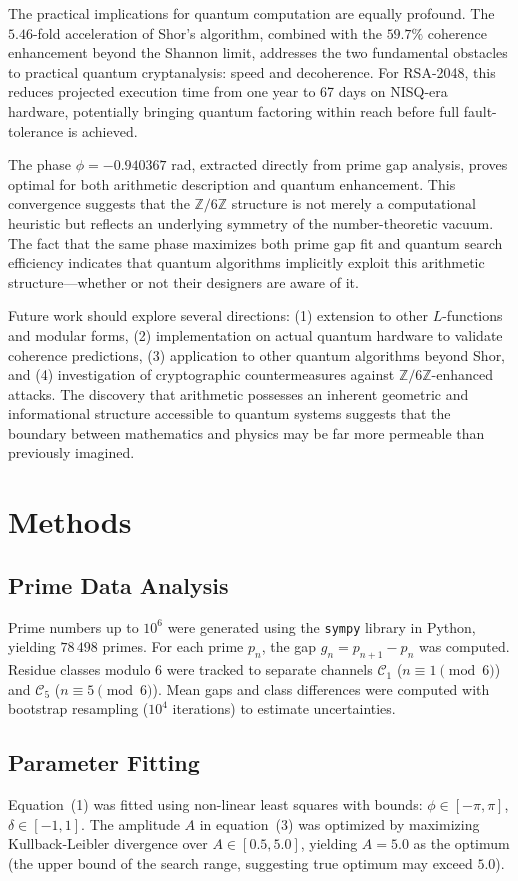 \documentclass[pdflatex,sn-nature]{sn-jnl}
\theoremstyle{thmstyleone}
\theoremstyle{thmstyletwo}
\theoremstyle{thmstylethree}
\newcommand{\Zmod}{\mathbb{Z}/6\mathbb{Z}}
\begin{document}
The practical implications for quantum computation are equally profound. The $5.46$-fold acceleration of Shor's algorithm, combined with the $59.7\%$ coherence enhancement beyond the Shannon limit, addresses the two fundamental obstacles to practical quantum cryptanalysis: speed and decoherence. For RSA-2048, this reduces projected execution time from one year to 67 days on NISQ-era hardware, potentially bringing quantum factoring within reach before full fault-tolerance is achieved.

The phase $\phi=-0.940367$ rad, extracted directly from prime gap analysis, proves optimal for both arithmetic description and quantum enhancement. This convergence suggests that the $\Zmod$ structure is not merely a computational heuristic but reflects an underlying symmetry of the number-theoretic vacuum. The fact that the same phase maximizes both prime gap fit and quantum search efficiency indicates that quantum algorithms implicitly exploit this arithmetic structure---whether or not their designers are aware of it.

Future work should explore several directions: (1) extension to other $L$-functions and modular forms, (2) implementation on actual quantum hardware to validate coherence predictions, (3) application to other quantum algorithms beyond Shor, and (4) investigation of cryptographic countermeasures against $\Zmod$-enhanced attacks. The discovery that arithmetic possesses an inherent geometric and informational structure accessible to quantum systems suggests that the boundary between mathematics and physics may be far more permeable than previously imagined.

\section*{Methods}

\subsection*{Prime Data Analysis}
Prime numbers up to $10^6$ were generated using the \texttt{sympy} library in Python, yielding $78\,498$ primes. For each prime $p_n$, the gap $g_n = p_{n+1} - p_n$ was computed. Residue classes modulo $6$ were tracked to separate channels $\mathcal{C}_1$ ($n\equiv1\pmod{6}$) and $\mathcal{C}_5$ ($n\equiv5\pmod{6}$). Mean gaps and class differences were computed with bootstrap resampling ($10^4$ iterations) to estimate uncertainties.

\subsection*{Parameter Fitting}
Equation~(1) was fitted using non-linear least squares with bounds: $\phi\in[-\pi,\pi]$, $\delta\in[-1,1]$. The amplitude $A$ in equation~(3) was optimized by maximizing Kullback-Leibler divergence over $A\in[0.5,5.0]$, yielding $A=5.0$ as the optimum (the upper bound of the search range, suggesting true optimum may exceed $5.0$).
\end{document}
